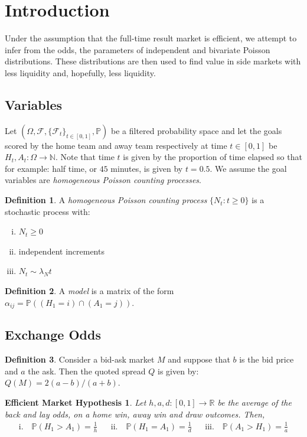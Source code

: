 \documentclass[a4paper,11pt,oneside]{book}
\theoremstyle{plain}
\newtheorem*{emh}{Efficient Market Hypothesis}
\theoremstyle{definition}
\newtheorem{defn}{Definition}[section]
\begin{document}
\section{Introduction}
Under the assumption that the full-time result market is efficient, we attempt to infer from the odds, the parameters of independent and bivariate Poisson distributions. These distributions are then used to find value in side markets with less liquidity and, hopefully, less liquidity. 
\subsection{Variables}
Let $(\Omega,\mathcal{F},\{\mathcal{F}_t\}_{t \in [0,1]},\mathbb{P})$ be a filtered probability space and let the goals scored by the home team and away team respectively at time $t \in [0,1]$ be $H_t,A_t:\Omega\rightarrow \mathbb{N}$. Note that time $t$ is given by the proportion of time elapsed so that for example: half time, or $45$ minutes, is given by $t=0.5$. We assume the goal variables are \emph{homogeneous Poisson counting processes}.
\begin{defn} A \emph{homogeneous Poisson counting process} $\{N_t:t \ge 0\}$ is a stochastic process with:
\begin{enumerate}[i.]
\item $N_t \ge 0$
\item independent increments
\item $N_t \sim \lambda_Nt$
\end{enumerate} 
\end{defn}
\begin{defn}
A \emph{model} is a matrix of the form $\alpha_{ij}=\mathbb{P}((H_1=i)\cap (A_1=j))$.
\end{defn}
\subsection{Exchange Odds}
\begin{defn}
Consider a bid-ask market $M$ and suppose that $b$ is the bid price and $a$ the ask. Then the quoted spread $Q$ is given by:
$Q(M)=2(a-b)/(a+b)$.
\end{defn}
\begin{emh}
Let $h,a,d:[0,1]\rightarrow \mathbb{R}$ be the average of the back and lay odds, on a home win, away win and draw outcomes. Then,
\begin{align*}
\text{i.} \quad \mathbb{P}(H_1>A_1)=\frac{1}{h} && \text{ii.} \quad\mathbb{P}(H_1=A_1)=\frac{1}{d} && \text{iii.} \quad\mathbb{P}(A_1>H_1)=\frac{1}{a}
\end{align*}
\end{emh}
\end{document}
